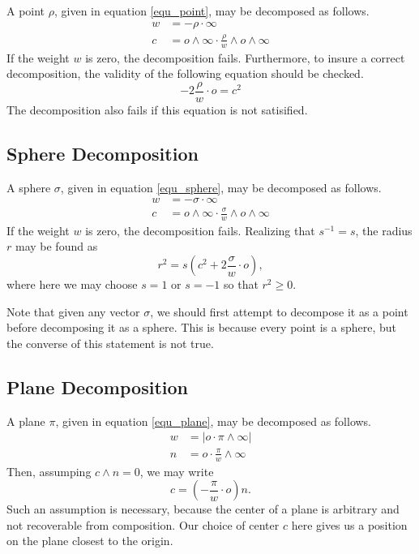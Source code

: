 \documentclass[12pt]{article}
\newcommand{\nvao}{o}
\newcommand{\nvai}{\infty}
\begin{document}
A point $\rho$, given in equation \eqref{equ_point}, may be decomposed as follows.
\begin{align}
w &= -\rho\cdot\nvai \\
c &= \nvao\wedge\nvai\cdot\frac{\rho}{w}\wedge\nvao\wedge\nvai
\end{align}
If the weight $w$ is zero, the decomposition fails.
Furthermore, to insure a correct decomposition, the validity of the following equation should be checked.
\begin{equation}
-2\frac{\rho}{w}\cdot\nvao=c^2
\end{equation}
The decomposition also fails if this equation is not satisified.

\subsection{Sphere Decomposition}

A sphere $\sigma$, given in equation \eqref{equ_sphere}, may be decomposed as follows.
\begin{align}
w &= -\sigma\cdot\nvai \\
c &= \nvao\wedge\nvai\cdot\frac{\sigma}{w}\wedge\nvao\wedge\nvai
\end{align}
If the weight $w$ is zero, the decomposition fails.
Realizing that $s^{-1}=s$, the radius $r$ may be found as
\begin{equation}
r^2 = s\left(c^2+2\frac{\sigma}{w}\cdot\nvao\right),
\end{equation}
where here we may choose $s=1$ or $s=-1$ so that $r^2\geq 0$.

Note that given any vector $\sigma$, we should first attempt to decompose it as a point
before decomposing it as a sphere.  This is because every point is a sphere, but the
converse of this statement is not true.

\subsection{Plane Decomposition}

A plane $\pi$, given in equation \eqref{equ_plane}, may be decomposed as follows.
\begin{align}
w &= |\nvao\cdot\pi\wedge\nvai| \\
n &= \nvao\cdot\frac{\pi}{w}\wedge\nvai
\end{align}
Then, assumping $c\wedge n=0$, we may write
\begin{equation}
c=\left(-\frac{\pi}{w}\cdot\nvao\right)n.
\end{equation}
Such an assumption is necessary, because the center of a plane is arbitrary
and not recoverable from composition.  Our choice of center $c$ here
gives us a position on the plane closest to the origin.
\end{document}
